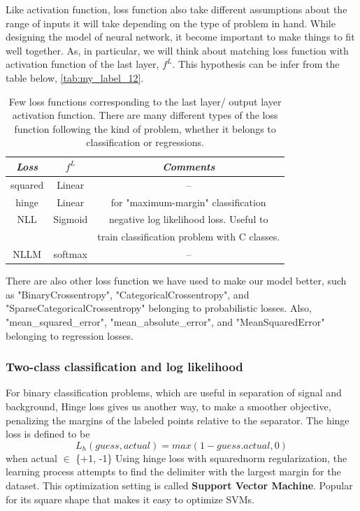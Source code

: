 Like activation function, loss function also take different assumptions about the range of inputs it will take depending on the type of problem in hand. While designing the model of neural network, it become important to make things to fit well together. As, in particular, we will think about matching loss function with activation function of the last layer, $f^L$\cite{https://doi.org/10.48550/arxiv.1702.05659}. This hypothesis can be infer from the table below, \autoref{tab:my_label_12}.\\
\begin{table}[h]
    \centering
    \begin{tabular}{ccc} \hline
   \textit{   Loss }  & \textit{ $f^L$} & \textit{Comments}\\ \hline
      squared   &  Linear &  --\\
      hinge  &  Linear &  for "maximum-margin" classification\\
      NLL &   Sigmoid &   negative log likelihood loss. Useful to \\ 
      &    &       train classification problem with C classes.\\
      NLLM & softmax & -- \\
      
    \end{tabular}
    \caption{Few loss functions corresponding to the last layer/ output layer activation function. There are many different types of the loss function following the kind of problem, whether it belongs to classification or regressions. }
    \label{tab:my_label_12}
\end{table}
There are also other loss function we have used to make our model better, such as "BinaryCrossentropy", "CategoricalCrossentropy", and
"SparseCategoricalCrossentropy" belonging to probabilistic losses. Also, "mean\_squared\_error", "mean\_absolute\_error", and "MeanSquaredError" belonging to regression losses.
 
\subsubsection{Two-class classification and log likelihood}

For binary classification problems, which are useful in separation of signal and background, Hinge loss gives us another way, to make a smoother objective, penalizing the margins of the labeled points relative to the separator. The hinge loss is defined to be
\begin{equation*}
    L_h(guess, actual) = max(1-guess.actual,0)
\end{equation*}
when actual $\in$ \{+1, -1\}
Using hinge loss with  squarednorm regularization, the learning process attempts to  find  the delimiter with the largest margin for the dataset. This optimization setting is called \textbf{Support Vector Machine}. Popular for its square shape that makes it easy to optimize SVMs\cite{https://doi.org/10.48550/arxiv.1511.08861}.

